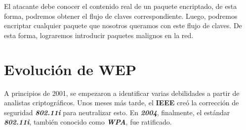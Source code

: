 \documentclass[
]{article}
\begin{document}
El atacante debe conocer el contenido real de un paquete encriptado, de
esta forma, podremos obtener el flujo de claves correspondiente. Luego,
podremos encriptar cualquier paquete que nosotros queramos con este
flujo de claves. De esta forma, lograremos introducir paquetes malignos
en la red.

\hypertarget{evoluciuxf3n-de-wep}{%
\section{Evolución de WEP}\label{evoluciuxf3n-de-wep}}

A principios de 2001, se empezaron a identificar varias debilidades a
partir de analistas criptográficos. Unos meses más tarde, el
\textbf{IEEE} creó la corrección de seguridad \textbf{\emph{802.11i}}
para neutralizar esto. En \textbf{\emph{2004}}, finalmente, el estándar
\textbf{\emph{802.11i}}, también conocido como \textbf{\emph{WPA}}, fue
ratificado.
\end{document}
